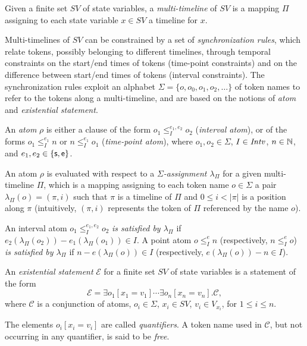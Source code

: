 Given a finite set $SV$ of state variables, a \emph{multi-timeline} of $SV$ is a mapping $\Pi$ assigning to
each state variable $x\in SV$ a timeline for $x$.

Multi-timelines of $SV$ can be constrained by a set of \emph{synchronization
rules}, which relate tokens, possibly belonging to different timelines, through
temporal constraints on the start/end times of tokens (time-point constraints) and on the difference
between start/end times of tokens (interval constraints). The synchronization rules exploit
an alphabet $\Sigma=\{o,o_0,o_1,o_2,\ldots\}$ of token names to refer to the tokens along a multi-timeline, and are based on the notions of
\emph{atom} and \emph{existential statement}.

\begin{definition}[Atom]
  \label{def:timelines:atom}
  An \emph{atom} $\rho$ is either a clause of the form \mbox{$o_1\leq^{e_1,e_2}_{I} o_2$}
  (\emph{interval atom}), or of the forms $o_1\leq^{e_1}_{I} n$ or  $n\leq^{e_1}_{I}
  o_1$ (\emph{time-point atom}), where $o_1,o_2\in\Sigma$, $I\in{\mathit{Intv}}$, $n\in\mathbb{N}$, and $e_1,e_2\in\{\mathsf{s},\mathsf{e}\}$.
\end{definition}

An atom $\rho$ is evaluated with respect to a \emph{$\Sigma$-assignment $\lambda_\Pi$} for a given multi-timeline $\Pi$,
which is a mapping assigning to each token name $o\in \Sigma$ a pair $\lambda_\Pi(o)=(\pi,i)$ such that $\pi$ is a timeline of $\Pi$ and $0\leq i<|\pi|$ is a position along $\pi$ (intuitively,
$(\pi,i)$ represents the token of $\Pi$ referenced by the name $o$).

An interval atom $o_1\leq^{e_1,e_2}_{I} o_2$  \emph{is satisfied by  $\lambda_\Pi$} if $e_2(\lambda_\Pi(o_2))-e_1(\lambda_\Pi(o_1))\in I$.
A point atom $o\leq^{e}_{I} n$  (respectively, $n\leq^{e}_{I}o$)   \emph{is satisfied by  $\lambda_\Pi$} if $n-e(\lambda_\Pi(o))\in I$ (respectively, $e(\lambda_\Pi(o))-n\in I$).

\begin{definition}
 An \emph{existential statement} $\mathcal{E}$ for a finite set $SV$ of state variables is a statement of the form
\[
\mathcal{E}=  \exists o_1[x_1=v_1]\cdots \exists o_n[x_n=v_n].\mathcal{C},
\]
  where $\mathcal{C}$ %
  is a conjunction of atoms,
  $o_i\!\in\!\Sigma$, $x_i\!\in\! SV$, $v_i\!\in\! V_{x_i}$, for
  $1\leq i\leq n$. 

The elements $o_i[x_i=v_i]$ are called
  \emph{quantifiers}. A token name used in $\mathcal{C}$, but not occurring in any
  quantifier, is said to be \emph{free}. 
\end{definition}


